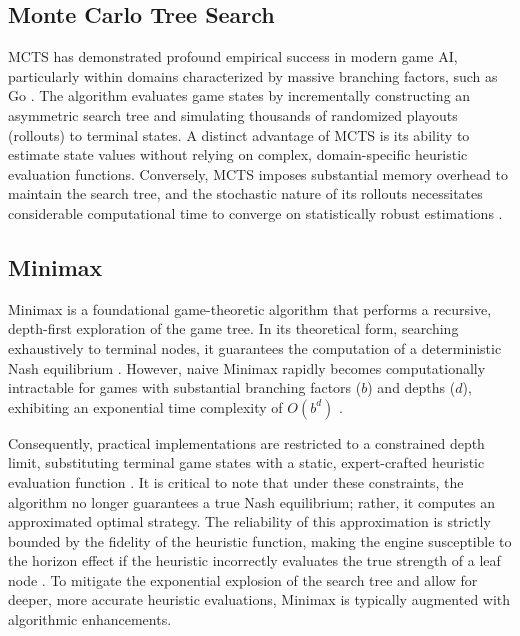 \subsection{Monte Carlo Tree Search}
MCTS has demonstrated profound empirical success in modern game AI, particularly within domains characterized by massive branching factors, such as Go \cite{SA2020survey}. The algorithm evaluates game states by incrementally constructing an asymmetric search tree and simulating thousands of randomized playouts (rollouts) to terminal states. A distinct advantage of MCTS is its ability to estimate state values without relying on complex, domain-specific heuristic evaluation functions. Conversely, MCTS imposes substantial memory overhead to maintain the search tree, and the stochastic nature of its rollouts necessitates considerable computational time to converge on statistically robust estimations \cite{MCTSminimax}.

\subsection{Minimax}
Minimax is a foundational game-theoretic algorithm that performs a recursive, depth-first exploration of the game tree. In its theoretical form, searching exhaustively to terminal nodes, it guarantees the computation of a deterministic Nash equilibrium \cite{MCTSminimax}. However, naive Minimax rapidly becomes computationally intractable for games with substantial branching factors ($b$) and depths ($d$), exhibiting an exponential time complexity of $O(b^d)$ \cite{Artificial_intelligence}.

Consequently, practical implementations are restricted to a constrained depth limit, substituting terminal game states with a static, expert-crafted heuristic evaluation function \cite{shannon1950programming}. It is critical to note that under these constraints, the algorithm no longer guarantees a true Nash equilibrium; rather, it computes an approximated optimal strategy. The reliability of this approximation is strictly bounded by the fidelity of the heuristic function, making the engine susceptible to the horizon effect if the heuristic incorrectly evaluates the true strength of a leaf node \cite{Artificial_intelligence}. To mitigate the exponential explosion of the search tree and allow for deeper, more accurate heuristic evaluations, Minimax is typically augmented with algorithmic enhancements.

